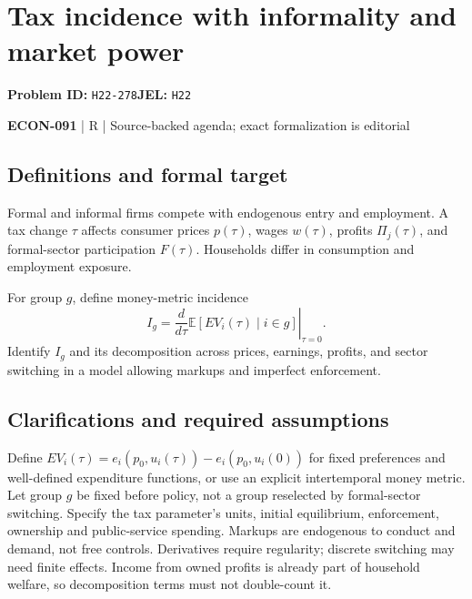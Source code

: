 \documentclass[11pt,a4paper]{article}
\begin{document}
\section*{Tax incidence with informality and market power}
\textbf{Problem ID:} \texttt{H22-278}\quad \textbf{JEL:} \texttt{H22}\par
\label{problem:OP-0650}


\label{audited:ECON-091}

{\sffamily\small\color{muted}\textbf{ECON-091} | R | Source-backed agenda; exact formalization is editorial\par}

\subsection*{Definitions and formal target}

Formal and informal firms compete with endogenous entry and employment. A tax change $\tau$ affects consumer prices $p(\tau)$, wages $w(\tau)$, profits $\Pi_j(\tau)$, and formal-sector participation $F(\tau)$. Households differ in consumption and employment exposure.

For group $g$, define money-metric incidence
\[
 I_g=\left.\frac{d}{d\tau}\mathbb E[EV_i(\tau)\mid i\in g]\right|_{\tau=0}.
\]
Identify $I_g$ and its decomposition across prices, earnings, profits, and sector switching in a model allowing markups and imperfect enforcement.

\subsection*{Clarifications and required assumptions}

Define \(EV_i(\tau)=e_i(p_0,u_i(\tau))-e_i(p_0,u_i(0))\) for fixed preferences and well-defined expenditure functions, or use an explicit intertemporal money metric. Let group \(g\) be fixed before policy, not a group reselected by formal-sector switching. Specify the tax parameter's units, initial equilibrium, enforcement, ownership and public-service spending. Markups are endogenous to conduct and demand, not free controls. Derivatives require regularity; discrete switching may need finite effects. Income from owned profits is already part of household welfare, so decomposition terms must not double-count it.
\end{document}
